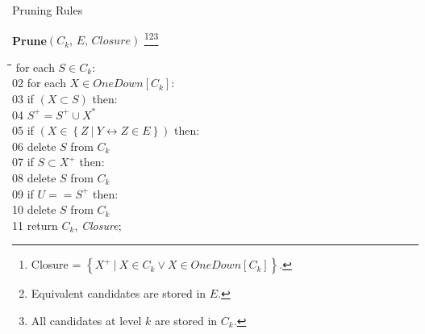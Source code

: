 \documentclass[6pt,twoside]{article}
\theoremstyle{plain}
\theoremstyle{definition}
\begin{document}
\begin{section}{Pruning Rules}
\bigskip
{
\noindent
\textbf{Prune}$\left( C_{k} \text{, } E \text{, } Closure \right)$ \footnote{Closure = $\left\{  X^{+} \ | \  X \in C_{k} \vee X \in OneDown \left[ C_{k} \right] \right\}$.}\footnote{Equivalent candidates are stored in $E$.}\footnote{All candidates at level $k$ are stored in $C_k$.}
\begin{tabbing}
 \hspace{30pt}\=\hspace{30pt}\=\hspace{30pt}\=\hspace{30pt}\= for each $S \in C_k$: \\
02	\> for each $X \in OneDown\left[  C_k \right]$: \\
03	\> \>  if $\left( X \subset S \right)$ then: \\
04	\> \> \> $S^{+} = S^{+}  \cup X^{*}$ \\
05	\> \> \> if $\left( X \in \left\{ Z \ | \ Y \leftrightarrow Z \in E \right\} \right)$ then: \\
06	\> \> \> \> delete $S$ from $C_k$ \\
07 	\> \> \> if $S \subset X^{+}$ then: \\
08 	\> \> \> \> delete $S$ from $C_k$ \\
09 	\> \> \> if $U == S^{+}$ then: \\
10 	\> \> \> \> delete $S$ from $C_k$ \\
11 return $C_k$, \textit{Closure};
\end{tabbing}
} 

\cite{expAlgs}
\cite{fdmine1}
\cite{fdmine2}
\cite{dbbook}

\end{section}
\end{document}
